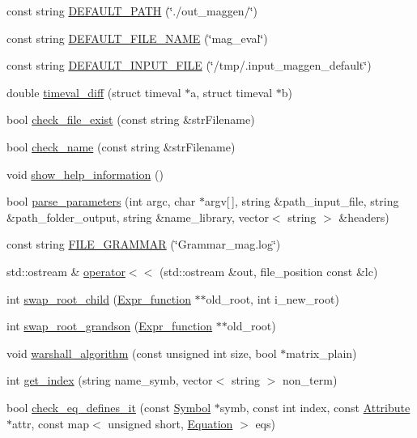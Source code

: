 \begin{DoxyCompactItemize}
\item 
const string \hyperlink{namespacegenevalmag_a7bb640f537df129ffe4ed8cc5f703d90}{DEFAULT\_\-PATH} (\char`\"{}./out\_\-maggen/\char`\"{})
\item 
const string \hyperlink{namespacegenevalmag_aa939bb88a9eee5dd79de6b2c0d9dc27b}{DEFAULT\_\-FILE\_\-NAME} (\char`\"{}mag\_\-eval\char`\"{})
\item 
const string \hyperlink{namespacegenevalmag_ac01c19863afca7ad5f021857f24032c3}{DEFAULT\_\-INPUT\_\-FILE} (\char`\"{}/tmp/.input\_\-maggen\_\-default\char`\"{})
\item 
double \hyperlink{namespacegenevalmag_a885d7859db4dd91f78bb7081be6ceacb}{timeval\_\-diff} (struct timeval $\ast$a, struct timeval $\ast$b)
\item 
bool \hyperlink{namespacegenevalmag_a8d54caf5e5830cd48bf3265345928c3a}{check\_\-file\_\-exist} (const string \&strFilename)
\item 
bool \hyperlink{namespacegenevalmag_a3bc888ab3b44c41a536427cf386f8c3d}{check\_\-name} (const string \&strFilename)
\item 
void \hyperlink{namespacegenevalmag_afe9d3ca44e4de7e9ebe9f47a62ed7aa5}{show\_\-help\_\-information} ()
\item 
bool \hyperlink{namespacegenevalmag_ad3dcc8f1c112c2fee686c837e5250124}{parse\_\-parameters} (int argc, char $\ast$argv\mbox{[}$\,$\mbox{]}, string \&path\_\-input\_\-file, string \&path\_\-folder\_\-output, string \&name\_\-library, vector$<$ string $>$ \&headers)
\item 
const string \hyperlink{namespacegenevalmag_add88c73415b1eb5c506b9d66b294b7cf}{FILE\_\-GRAMMAR} (\char`\"{}Grammar\_\-mag.log\char`\"{})
\item 
std::ostream \& \hyperlink{namespacegenevalmag_a4093becff20c4564db790c08c1189aaf}{operator$<$$<$} (std::ostream \&out, file\_\-position const \&lc)
\item 
int \hyperlink{namespacegenevalmag_a5132358a5088f64e976aa18643cff4d8}{swap\_\-root\_\-child} (\hyperlink{classgenevalmag_1_1Expr__function}{Expr\_\-function} $\ast$$\ast$old\_\-root, int i\_\-new\_\-root)
\item 
int \hyperlink{namespacegenevalmag_a18228f21bca4decde649041801026a35}{swap\_\-root\_\-grandson} (\hyperlink{classgenevalmag_1_1Expr__function}{Expr\_\-function} $\ast$$\ast$old\_\-root)
\item 
void \hyperlink{namespacegenevalmag_a311f0385029ff37574bbf0189064f310}{warshall\_\-algorithm} (const unsigned int size, bool $\ast$matrix\_\-plain)
\item 
int \hyperlink{namespacegenevalmag_a6442b82b3f1265663c5bdb2bc80f4421}{get\_\-index} (string name\_\-symb, vector$<$ string $>$ non\_\-term)
\item 
bool \hyperlink{namespacegenevalmag_ad0ec9b7706a340d2e674f3b4859afa2d}{check\_\-eq\_\-defines\_\-it} (const \hyperlink{classgenevalmag_1_1Symbol}{Symbol} $\ast$symb, const int index, const \hyperlink{classgenevalmag_1_1Attribute}{Attribute} $\ast$attr, const map$<$ unsigned short, \hyperlink{classgenevalmag_1_1Equation}{Equation} $>$ eqs)
\end{DoxyCompactItemize}
